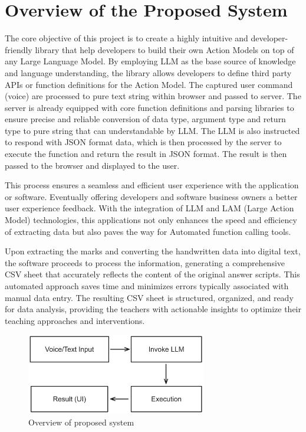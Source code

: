\section{Overview of the Proposed System}

\noindent The core objective of this project is to create a highly intuitive and developer-friendly library that help developers to build their own Action Models on top of any Large Language Model. By employing LLM as the base source of knowledge and language understanding, the library allows developers to define third party APIs or function definitions for the Action Model. The captured user command (voice) are processed to pure text string within browser and passed to server. The server is already equipped with core function definitions and parsing libraries to ensure precise and reliable conversion of data type, argument type and return type to pure string that can understandable by LLM. The LLM is also instructed to respond with JSON format data, which is then processed by the server to execute the function and return the result in JSON format. The result is then passed to the browser and displayed to the user.

\noindent This process ensures a seamless and efficient user experience with the application or software. Eventually offering developers and software business owners a better user experience feedback. With the integration of LLM and LAM (Large Action Model) technologies, this applications not only enhances the speed and efficiency of extracting data but also paves the way for Automated function calling tools.

\noindent Upon extracting the marks and converting the handwritten data into digital text, the software proceeds to process the information, generating a comprehensive CSV sheet that accurately reflects the content of the original answer scripts. This automated approach saves time and minimizes errors typically associated with manual data entry. The resulting CSV sheet is structured, organized, and ready for data analysis, providing the teachers with actionable insights to optimize their teaching approaches and interventions.

\begin{figure}[htbp]
  \centering
  \includegraphics[width=0.7\textwidth]{Images/prop_sys/overview_prop_sys.png}
  \caption{Overview of proposed system}
\end{figure}

